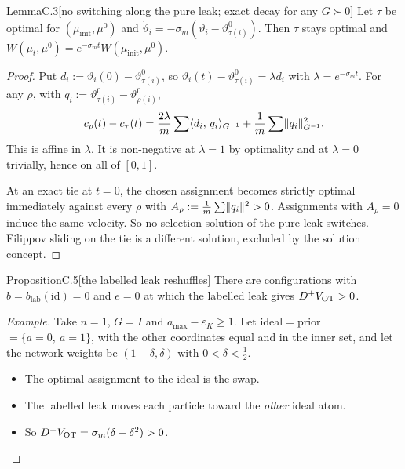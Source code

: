 \begin{thm}{Lemma}{C.3}[no switching along the pure leak; exact decay for any $G\succ0$]
Let $\tau$ be optimal for $(\mu_{\mathrm{init}},\mu^0)$ and $\dot\vartheta_i = -\sigma_m(\vartheta_i -
\vartheta^0_{\tau(i)})$. Then $\tau$ stays optimal and
$W(\mu_t,\mu^0) = e^{-\sigma_m t}W(\mu_{\mathrm{init}},\mu^0)$.
\end{thm}

\begin{proof}
Put $d_i := \vartheta_i(0) - \vartheta^0_{\tau(i)}$, so $\vartheta_i(t) - \vartheta^0_{\tau(i)} = \lambda d_i$ with
$\lambda = e^{-\sigma_m t}$. For any $\rho$, with $q_i := \vartheta^0_{\tau(i)} - \vartheta^0_{\rho(i)}$,
\[
  c_\rho(t) - c_\tau(t) = \frac{2\lambda}{m}\sum\langle d_i,\, q_i\rangle_{G^{-1}} + \frac1m\sum\lVert q_i\rVert^2_{G^{-1}}.
\]
This is affine in $\lambda$. It is non-negative at $\lambda = 1$ by optimality and at $\lambda = 0$ trivially, hence
on all of $[0,1]$.

At an exact tie at $t = 0$, the chosen assignment becomes strictly optimal immediately against every $\rho$ with
$A_\rho := \frac1m\sum\lVert q_i\rVert^2 > 0$. Assignments with $A_\rho = 0$ induce the same velocity. So no selection
solution of the pure leak switches. Filippov sliding on the tie is a different solution, excluded by the solution
concept.
\end{proof}

\begin{thm}{Proposition}{C.5}[the labelled leak reshuffles]
There are configurations with $b = b_{\mathrm{lab}}(\mathrm{id}) = 0$ and $e = 0$ at which the labelled leak gives
$D^+V_{\mathrm{OT}} > 0$.
\end{thm}

\begin{proof}[Example]
Take $n = 1$, $G = I$ and $a_{\max} - \varepsilon_K \ge 1$. Let ideal${}={}$prior${}=\{a=0,\ a=1\}$, with the
other coordinates equal and in the inner set, and let the network weights be $(1-\delta,\delta)$ with
$0 < \delta < \frac12$.
\begin{itemize}
  \item The optimal assignment to the ideal is the swap.
  \item The labelled leak moves each particle toward the \emph{other} ideal atom.
  \item So $D^+V_{\mathrm{OT}} = \sigma_m(\delta - \delta^2) > 0$. \qedhere
\end{itemize}
\end{proof}

